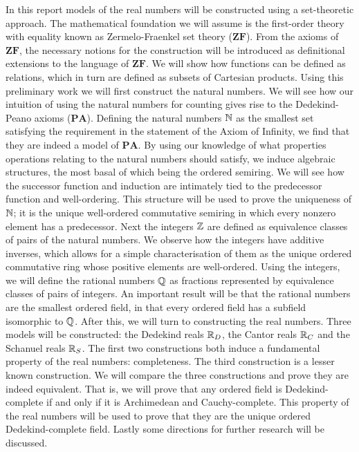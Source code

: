 \documentclass[../main.tex]{subfiles}
\begin{document}
In this report models of the real numbers will be constructed using a set-theoretic approach. The mathematical foundation we will assume is the first-order theory with equality known as Zermelo-Fraenkel set theory ($\mathbf{ZF}$). From the axioms of $\mathbf{ZF}$, the necessary notions for the construction will be introduced as definitional extensions to the language of $\mathbf{ZF}$. We will show how functions can be defined as relations, which in turn are defined as subsets of Cartesian products. Using this preliminary work we will first construct the natural numbers. We will see how our intuition of using the natural numbers for counting gives rise to the Dedekind-Peano axioms ($\mathbf{PA}$). Defining the natural numbers $\mathbb{N}$ as the smallest set satisfying the requirement in the statement of the Axiom of Infinity, we find that they are indeed a model of $\mathbf{PA}$. By using our knowledge of what properties operations relating to the natural numbers should satisfy, we induce algebraic structures, the most basal of which being the ordered semiring. We will see how the successor function and induction are intimately tied to the predecessor function and well-ordering. This structure will be used to prove the uniqueness of $\mathbb{N}$; it is the unique well-ordered commutative semiring in which every nonzero element has a predecessor. Next the integers $\mathbb{Z}$ are defined as equivalence classes of pairs of the natural numbers. We observe how the integers have additive inverses, which allows for a simple characterisation of them as the unique ordered commutative ring whose positive elements are well-ordered. Using the integers, we will define the rational numbers $\mathbb{Q}$ as fractions represented by equivalence classes of pairs of integers. An important result will be that the rational numbers are the smallest ordered field, in that every ordered field has a subfield isomorphic to $\mathbb{Q}$. After this, we will turn to constructing the real numbers. Three models will be constructed: the Dedekind reals $\mathbb{R}_D$, the Cantor reals $\mathbb{R}_C$ and the Schanuel reals $\mathbb{R}_S$. The first two constructions both induce a fundamental property of the real numbers: completeness. The third construction is a lesser known construction. We will compare the three constructions and prove they are indeed equivalent. That is, we will prove that any ordered field is Dedekind-complete if and only if it is Archimedean and Cauchy-complete. This property of the real numbers will be used to prove that they are the unique ordered Dedekind-complete field. Lastly some directions for further research will be discussed.
\end{document}
